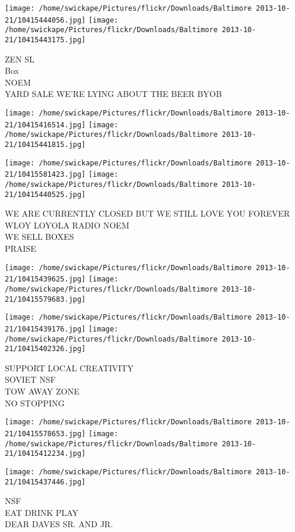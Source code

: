 \documentclass[10pt,letterpaper]{article}
\begin{document}
\texttt{[image: /home/swickape/Pictures/flickr/Downloads/Baltimore 2013-10-21/10415444056.jpg]}
\texttt{[image: /home/swickape/Pictures/flickr/Downloads/Baltimore 2013-10-21/10415443175.jpg]}

ZEN SL\\
Box\\
NOEM\\
YARD SALE WE'RE LYING ABOUT THE BEER BYOB
\pagebreak

\texttt{[image: /home/swickape/Pictures/flickr/Downloads/Baltimore 2013-10-21/10415416514.jpg]}
\texttt{[image: /home/swickape/Pictures/flickr/Downloads/Baltimore 2013-10-21/10415441815.jpg]}

\texttt{[image: /home/swickape/Pictures/flickr/Downloads/Baltimore 2013-10-21/10415581423.jpg]}
\texttt{[image: /home/swickape/Pictures/flickr/Downloads/Baltimore 2013-10-21/10415440525.jpg]}

WE ARE CURRENTLY CLOSED BUT WE STILL LOVE YOU FOREVER\\
WLOY LOYOLA RADIO NOEM\\
WE SELL BOXES\\
PRAISE
\pagebreak

\texttt{[image: /home/swickape/Pictures/flickr/Downloads/Baltimore 2013-10-21/10415439625.jpg]}
\texttt{[image: /home/swickape/Pictures/flickr/Downloads/Baltimore 2013-10-21/10415579683.jpg]}

\texttt{[image: /home/swickape/Pictures/flickr/Downloads/Baltimore 2013-10-21/10415439176.jpg]}
\texttt{[image: /home/swickape/Pictures/flickr/Downloads/Baltimore 2013-10-21/10415402326.jpg]}

SUPPORT LOCAL CREATIVITY\\
SOVIET NSF\\
TOW AWAY ZONE\\
NO STOPPING
\pagebreak

\texttt{[image: /home/swickape/Pictures/flickr/Downloads/Baltimore 2013-10-21/10415578653.jpg]}
\texttt{[image: /home/swickape/Pictures/flickr/Downloads/Baltimore 2013-10-21/10415412234.jpg]}

\vspace{0.25in}
\texttt{[image: /home/swickape/Pictures/flickr/Downloads/Baltimore 2013-10-21/10415437446.jpg]}

NSF\\
EAT DRINK PLAY\\
DEAR DAVES SR. AND JR.
\pagebreak
\end{document}
